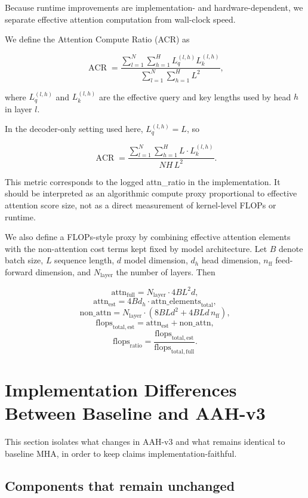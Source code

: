 \documentclass[11pt]{article}
\begin{document}
Because runtime improvements are implementation- and hardware-dependent, we separate effective attention computation from wall-clock speed.

We define the Attention Compute Ratio (ACR) as

\[
\operatorname{ACR}
=
\frac{\sum_{l=1}^{N}\sum_{h=1}^{H} L_q^{(l,h)}L_k^{(l,h)}}{\sum_{l=1}^{N}\sum_{h=1}^{H}L^2},
\]

where $L_q^{(l,h)}$ and $L_k^{(l,h)}$ are the effective query and key lengths used by head $h$ in layer $l$.

In the decoder-only setting used here, $L_q^{(l,h)}=L$, so

\[
\operatorname{ACR}
=
\frac{\sum_{l=1}^{N}\sum_{h=1}^{H}L\cdot L_k^{(l,h)}}{NH\,L^2}.
\]

This metric corresponds to the logged attn_ratio in the implementation. It should be interpreted as an algorithmic compute proxy proportional to effective attention score size, not as a direct measurement of kernel-level FLOPs or runtime.

We also define a FLOPs-style proxy by combining effective attention elements with the non-attention cost terms kept fixed by model architecture. Let $B$ denote batch size, $L$ sequence length, $d$ model dimension, $d_h$ head dimension, $n_{\mathrm{ff}}$ feed-forward dimension, and $N_{\mathrm{layer}}$ the number of layers. Then

\[
\mathrm{attn}_{\mathrm{full}} = N_{\mathrm{layer}} \cdot 4BL^2d,
\]
\[
\mathrm{attn}_{\mathrm{est}} = 4Bd_h \cdot \mathrm{attn\_elements}_{\mathrm{total}},
\]
\[
\mathrm{non\_attn}
=
N_{\mathrm{layer}}
\cdot
\left(8BLd^2 + 4BLd\,n_{\mathrm{ff}}\right),
\]
\[
\mathrm{flops}_{\mathrm{total,est}}
=
\mathrm{attn}_{\mathrm{est}} + \mathrm{non\_attn},
\]
\[
\mathrm{flops}_{\mathrm{ratio}}
=
\frac{\mathrm{flops}_{\mathrm{total,est}}}{\mathrm{flops}_{\mathrm{total,full}}}.
\]



\section{Implementation Differences Between Baseline and AAH-v3}

This section isolates what changes in AAH-v3 and what remains identical to baseline MHA, in order to keep claims implementation-faithful.

\subsection{Components that remain unchanged}
\end{document}
